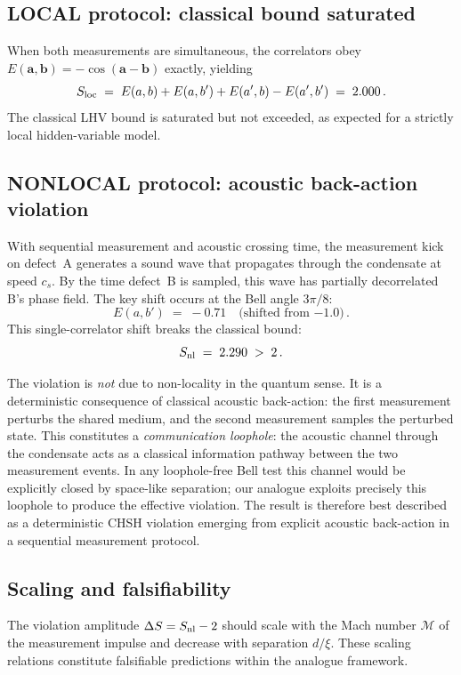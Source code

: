 \documentclass[reprint,amsmath,amssymb,aps,prl,superscriptaddress]{revtex4-2}
\begin{document}
\subsection{LOCAL protocol: classical bound saturated}

When both measurements are simultaneous, the correlators obey
$E(\mathbf{a},\mathbf{b})=-\cos(\mathbf{a}-\mathbf{b})$ exactly,
yielding
\[
S_{\rm loc} \;=\; E(a,b)+E(a,b')+E(a',b)-E(a',b') \;=\; 2.000\,.
\]
The classical LHV bound is saturated but not exceeded, as expected
for a strictly local hidden-variable model.

\subsection{NONLOCAL protocol: acoustic back-action violation}

With sequential measurement and acoustic crossing time, the
measurement kick on defect~A generates a sound wave that propagates
through the condensate at speed $c_s$.  By the time defect~B is
sampled, this wave has partially decorrelated B's phase field.
The key shift occurs at the Bell angle $3\pi/8$:
\[
E(a,b') \;=\; -0.71 \quad\text{(shifted from $-1.0$)}\,.
\]
This single-correlator shift breaks the classical bound:
\[
S_{\rm nl} \;=\; 2.290 \;>\; 2\,.
\]

The violation is \emph{not} due to non-locality in the quantum sense.
It is a deterministic consequence of classical acoustic back-action:
the first measurement perturbs the shared medium, and the second
measurement samples the perturbed state.  This constitutes a
\emph{communication loophole}: the acoustic channel through the
condensate acts as a classical information pathway between the
two measurement events.  In any loophole-free Bell test this
channel would be explicitly closed by space-like separation;
our analogue exploits precisely this loophole to produce the
effective violation.  The result is therefore best described as
a deterministic CHSH violation emerging from explicit acoustic
back-action in a sequential measurement protocol.

\subsection{Scaling and falsifiability}

The violation amplitude $\Delta S = S_{\rm nl}-2$ should scale with
the Mach number $\mathcal{M}$ of the measurement impulse and
decrease with separation $d/\xi$.  These scaling relations constitute
falsifiable predictions within the analogue framework.
\end{document}
